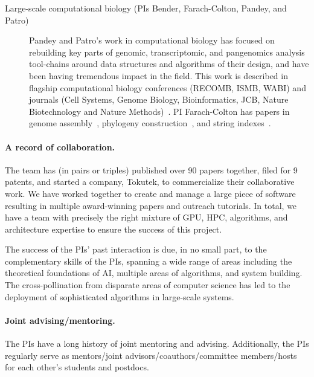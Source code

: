 \begin{description}
    \item[Large-scale computational biology (PIs Bender, Farach-Colton, Pandey, and Patro)] Pandey and Patro's work in computational biology has focused on rebuilding key parts of genomic, transcriptomic, and pangenomics analysis tool-chains around data structures and algorithms of their design, and have been having tremendous impact in the field. This work is described in flagship computational biology conferences (RECOMB, ISMB, WABI) and journals (Cell Systems, Genome Biology, Bioinformatics, JCB, Nature Biotechnology and Nature Methods)~\cite{PandeyAlBe18,PandeyBJP17,PandeyBeJo17b,AlmodaresiPFJP20,pandey2021variantstore,almodaresi2017rainbowfish,almodaresi2022incrementally,PatroSailfish:2014,Patro2017Salmon,Srivastava2019,he2022alevin,Almodaresi2018Pufferfish,Almodaresi2021}.  PI Farach-Colton has papers in genome assembly~\cite{Choi2003}, phylogeny construction~\cite{Farach97,Ambainis97,FarachKKM97,Farach1999, Cohen1997}, and string indexes~\cite{Farach97,Ambainis97}.

\end{description}




\paragraph{A record of collaboration.} The team has (in pairs or triples) published over 90 papers together, filed for
9 patents, and started a company, Tokutek, to commercialize their collaborative work. We have worked
together to create and manage a large piece of software resulting in multiple award-winning papers and
outreach tutorials. In total, we have a team with precisely the right mixture of GPU, HPC, algorithms, and architecture expertise to ensure the success of this project.

The success of the PIs’ past interaction is due, in no small part, to the complementary skills of the PIs,
spanning a wide range of areas including the theoretical foundations of AI, multiple areas of algorithms, and
system building. The cross-pollination from disparate areas of
computer science has led to the deployment of sophisticated algorithms in large-scale systems.

\paragraph{Joint advising/mentoring.} The PIs have a long history of joint mentoring and advising.  Additionally, the PIs regularly serve as mentors/joint advisors/coauthors/committee members/hosts for each other’s students and postdocs.
